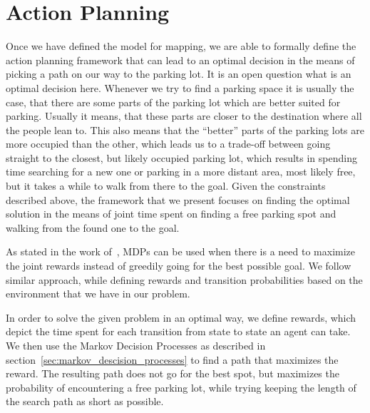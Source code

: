 \section{Action Planning} %
\label{sec:action_planning}
    Once we have defined the model for mapping, we are able to formally define the action planning framework that can lead to an optimal decision in the means of picking a path on our way to the parking lot.
    It is an open question what is an optimal decision here. Whenever we try to find a parking space it is usually the case, that there are some parts of the parking lot which are better suited for parking. Usually it means, that these parts are closer to the destination where all the people lean to.
    This also means that the ``better'' parts of the parking lots are more occupied than the other, which leads us to a trade-off between going straight to the closest, but likely occupied parking lot, which results in spending time searching for a new one or parking in a more distant area, most likely free, but it takes a while to walk from there to the goal.
    Given the constraints described above, the framework that we present focuses on finding the optimal solution in the means of joint time spent on finding a free parking spot and walking from the found one to the goal.

    As stated in the work of~\cite{tipaldiICRA11}, MDPs can be used when there is a need to maximize the joint rewards instead of greedily going for the best possible goal.
    We follow similar approach, while defining rewards and transition probabilities based on the environment that we have in our problem.

    In order to solve the given problem in an optimal way, we define rewards, which depict the time spent for each transition from state to state an agent can take. We then use the Markov Decision Processes as described in section~\ref{sec:markov_descision_processes} to find a path that maximizes the reward.
    The resulting path does not go for the best spot, but maximizes the probability of encountering a free parking lot, while trying keeping the length of the search path as short as possible.

